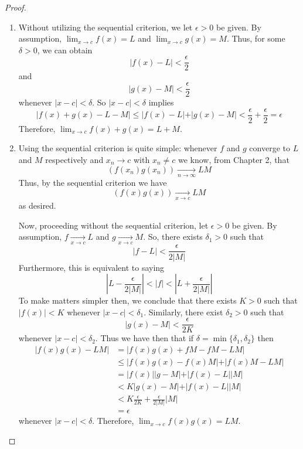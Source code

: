 \begin{enumerate}
\begin{proof}
\begin{enumerate}
    \item Without utilizing the sequential criterion, we let \( \epsilon > 0 \) be given. By assumption, \( \lim_{x \rightarrow c} f(x) = L \) and \( \lim_{x \rightarrow c} g(x) = M \). Thus, for some \( \delta > 0 \), we can obtain
    \[
    \vert f(x) - L \vert < \frac{\epsilon}{2}
    \]
    and
    \[
    \vert g(x) - M \vert < \frac{\epsilon}{2}
    \]
    whenever \( \vert x - c \vert < \delta \). So \( \vert x - c \vert < \delta \) implies
    \[
    \vert f(x) + g(x) - L - M \vert \leq \vert f(x) - L \vert + \vert g(x) - M \vert < \frac{\epsilon}{2} + \frac{\epsilon}{2} = \epsilon
    \]
    Therefore, \( \lim_{x \rightarrow c} f(x) + g(x) = L + M \). 
    
    \item Using the sequential criterion is quite simple: whenever \( f \) and \( g \) converge to \( L \) and \( M \) respectively and \( x_{n} \rightarrow c \) with \( x_{n} \neq c \) we know, from Chapter 2, that
    \[
    \left( f(x_{n})g(x_{n}) \right) \underset{n \rightarrow \infty}{\rightarrow} LM
    \]
    Thus, by the sequential criterion we have
    \[
    \left( f(x)g(x) \right) \underset{x \rightarrow c}{\rightarrow} LM
    \]
    as desired.
    \medskip
    
    Now, proceeding without the sequential criterion, let \( \epsilon > 0 \) be given. By assumption, \( f \underset{x \rightarrow c}{\rightarrow} L \) and \( g \underset{x \rightarrow c}{\rightarrow} M \). So, there exists \( \delta_{1} > 0 \) such that
    \[
    \vert f - L \vert < \frac{\epsilon}{2\vert M \vert}
    \]
    Furthermore, this is equivalent to saying
    \[
    \left| L- \frac{\epsilon}{2\vert M \vert} \right| < \left| f \right| < \left| L + \frac{\epsilon}{2 \vert M \vert } \right|
    \]
    To make matters simpler then, we conclude that there exists \( K > 0 \) such that \( \vert f(x) \vert < K \) whenever \( \vert x - c \vert < \delta_{1} \).  Similarly, there exist \( \delta_{2} > 0 \) such that
    \[
    \vert g(x) - M \vert < \frac{\epsilon}{2K}
    \]
    whenever \( \vert x - c \vert < \delta_{2} \). Thus we have then that if \( \delta = \min\{ \delta_{1},\delta_{2} \} \) then
    \begin{align*}
    \vert f(x)g(x) - LM \vert &= \vert f(x)g(x) + fM -fM - LM \vert \\
    &\leq \vert f(x)g(x)-f(x)M \vert + \vert f(x)M - LM \vert \\
    &= \vert f(x) \vert \vert g-M \vert + \vert f(x)-L \vert \vert M \vert \\
    &< K \vert g(x)-M \vert + \vert f(x)-L \vert \vert M \vert \\
    &< K \frac{\epsilon}{2K} + \frac{\epsilon}{2 \vert M \vert}\vert M \vert \\
    &= \epsilon
    \end{align*}
    whenever \( \vert x - c \vert < \delta \). Therefore, \( \lim_{x \rightarrow c} f(x)g(x) = LM \).
    \end{enumerate}
    \end{proof}
    

\end{enumerate}
